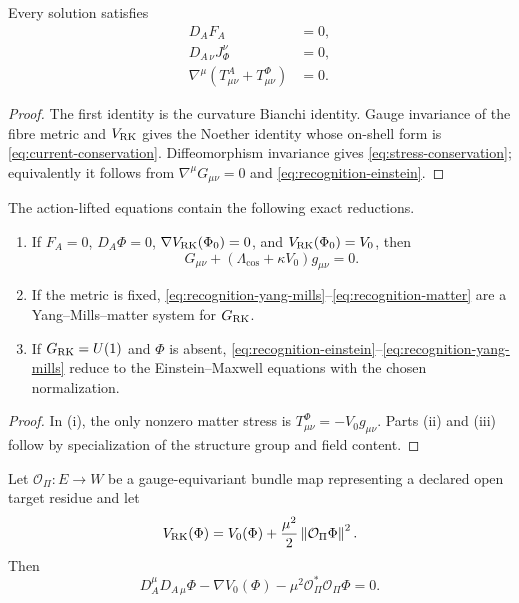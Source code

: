 \begin{corollary}
\label{cor:recognition-conservation}
Every solution satisfies
\begin{align}
D_AF_A&=0,
\label{eq:gauge-bianchi}\\
D_{A\,\nu}J_\Phi^\nu&=0,
\label{eq:current-conservation}\\
\nabla^\mu(T^A_{\mu\nu}+T^\Phi_{\mu\nu})&=0.
\label{eq:stress-conservation}
\end{align}
\end{corollary}

\begin{proof}
The first identity is the curvature Bianchi identity. Gauge invariance of the fibre metric and $V_{\mathrm{RK}}$ gives the Noether identity whose on-shell form is \eqref{eq:current-conservation}. Diffeomorphism invariance gives \eqref{eq:stress-conservation}; equivalently it follows from $\nabla^\mu G_{\mu\nu}=0$ and \eqref{eq:recognition-einstein}.
\end{proof}

\begin{corollary}
\label{cor:field-reductions}
The action-lifted equations contain the following exact reductions.
\begin{enumerate}[label=(\roman*)]
\item If $F_A=0$, $D_A\Phi=0$, $\nabla V_{\mathrm{RK}}(\Phi_0)=0$, and $V_{\mathrm{RK}}(\Phi_0)=V_0$, then
\[
G_{\mu\nu}+(\Lambda_{\mathrm{cos}}+\kappa V_0)g_{\mu\nu}=0.
\]
\item If the metric is fixed, \eqref{eq:recognition-yang-mills}--\eqref{eq:recognition-matter} are a Yang--Mills--matter system for $G_{\mathrm{RK}}$.
\item If $G_{\mathrm{RK}}=U(1)$ and $\Phi$ is absent, \eqref{eq:recognition-einstein}--\eqref{eq:recognition-yang-mills} reduce to the Einstein--Maxwell equations with the chosen normalization.
\end{enumerate}
\end{corollary}

\begin{proof}
In (i), the only nonzero matter stress is $T^\Phi_{\mu\nu}=-V_0g_{\mu\nu}$. Parts (ii) and (iii) follow by specialization of the structure group and field content.
\end{proof}

\begin{corollary}
Let $\mathcal O_\Pi:E\to W$ be a gauge-equivariant bundle map representing a declared open target residue and let
\[
V_{\mathrm{RK}}(\Phi)=V_0(\Phi)+\frac{\mu^2}{2}\left\lVert\mathcal O_\Pi\Phi\right\rVert^2.
\]
Then
\[
D_A^\mu D_{A\,\mu}\Phi
-\nabla V_0(\Phi)
-\mu^2\mathcal O_\Pi^*\mathcal O_\Pi\Phi=0.
\]
\end{corollary}

